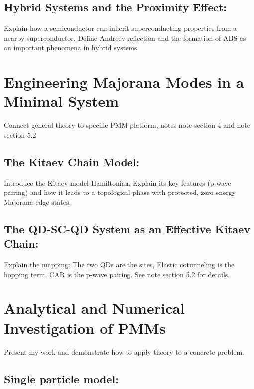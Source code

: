 \documentclass[11pt, letterpaper, titlepage]{article}
\begin{document}
\subsection{Hybrid Systems and the Proximity Effect:} Explain how a semiconductor can inherit superconducting properties from a nearby superconductor. Define Andreev reflection and the formation of ABS as an important phenomena in hybrid systems.\par

\section{Engineering Majorana Modes in a Minimal System}
Connect general theory to specific PMM platform, notes note section 4 and note section 5.2\par
\subsection{The Kitaev Chain Model:} Introduce the Kitaev model Hamiltonian. Explain its key features (p-wave pairing) and how it leads to a topological phase with protected, zero energy Majorana edge states.\par
\subsection{The QD-SC-QD System as an Effective Kitaev Chain:} Explain the mapping: The two QDs are the sites, Elastic cotunneling is the hopping term, CAR is the p-wave pairing. See note section 5.2 for details.\par

\section{Analytical and Numerical Investigation of PMMs}
Present my work and demonstrate how to apply theory to a concrete problem.\par
\subsection{Single particle model:}
\end{document}
